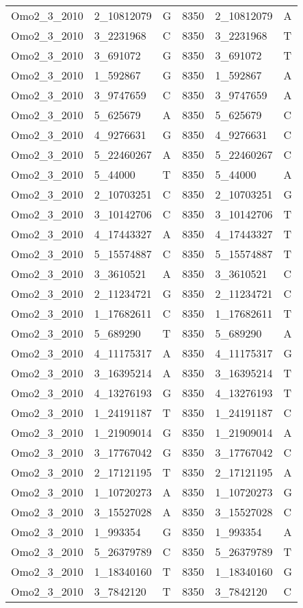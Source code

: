 \begin{center}
\begin{longtable}{|l|l|l|l|l|l|}
Omo2\_3\_2010&2\_10812079&G&8350&2\_10812079&A\\
Omo2\_3\_2010&3\_2231968&C&8350&3\_2231968&T\\
Omo2\_3\_2010&3\_691072&G&8350&3\_691072&T\\
Omo2\_3\_2010&1\_592867&G&8350&1\_592867&A\\
Omo2\_3\_2010&3\_9747659&C&8350&3\_9747659&A\\
Omo2\_3\_2010&5\_625679&A&8350&5\_625679&C\\
Omo2\_3\_2010&4\_9276631&G&8350&4\_9276631&C\\
Omo2\_3\_2010&5\_22460267&A&8350&5\_22460267&C\\
Omo2\_3\_2010&5\_44000&T&8350&5\_44000&A\\
Omo2\_3\_2010&2\_10703251&C&8350&2\_10703251&G\\
Omo2\_3\_2010&3\_10142706&C&8350&3\_10142706&T\\
Omo2\_3\_2010&4\_17443327&A&8350&4\_17443327&T\\
Omo2\_3\_2010&5\_15574887&C&8350&5\_15574887&T\\
Omo2\_3\_2010&3\_3610521&A&8350&3\_3610521&C\\
Omo2\_3\_2010&2\_11234721&G&8350&2\_11234721&C\\
Omo2\_3\_2010&1\_17682611&C&8350&1\_17682611&T\\
Omo2\_3\_2010&5\_689290&T&8350&5\_689290&A\\
Omo2\_3\_2010&4\_11175317&A&8350&4\_11175317&G\\
Omo2\_3\_2010&3\_16395214&A&8350&3\_16395214&T\\
Omo2\_3\_2010&4\_13276193&G&8350&4\_13276193&T\\
Omo2\_3\_2010&1\_24191187&T&8350&1\_24191187&C\\
Omo2\_3\_2010&1\_21909014&G&8350&1\_21909014&A\\
Omo2\_3\_2010&3\_17767042&G&8350&3\_17767042&C\\
Omo2\_3\_2010&2\_17121195&T&8350&2\_17121195&A\\
Omo2\_3\_2010&1\_10720273&A&8350&1\_10720273&G\\
Omo2\_3\_2010&3\_15527028&A&8350&3\_15527028&C\\
Omo2\_3\_2010&1\_993354&G&8350&1\_993354&A\\
Omo2\_3\_2010&5\_26379789&C&8350&5\_26379789&T\\
Omo2\_3\_2010&1\_18340160&T&8350&1\_18340160&G\\
Omo2\_3\_2010&3\_7842120&T&8350&3\_7842120&C\\

\end{longtable}
\end{center}
